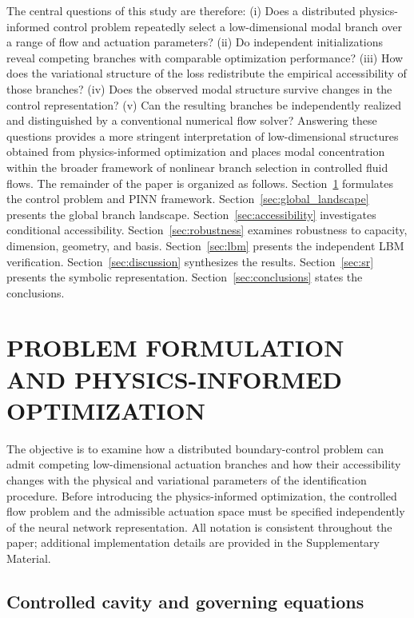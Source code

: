 \documentclass[a4paper,11pt]{article}
\begin{document}
The central questions of this study are therefore: (i) Does a distributed
physics-informed control problem repeatedly select a low-dimensional modal branch
over a range of flow and actuation parameters? (ii) Do independent initializations
reveal competing branches with comparable optimization performance? (iii) How does
the variational structure of the loss redistribute the empirical accessibility of
those branches? (iv) Does the observed modal structure survive changes in the
control representation? (v) Can the resulting branches be independently realized
and distinguished by a conventional numerical flow solver? Answering these questions
provides a more stringent interpretation of low-dimensional structures obtained from
physics-informed optimization and places modal concentration within the broader
framework of nonlinear branch selection in controlled fluid flows. The remainder of
the paper is organized as follows. Section~\ref{sec:problem_and_pinn} formulates the
control problem and PINN framework. Section~\ref{sec:global_landscape} presents the
global branch landscape. Section~\ref{sec:accessibility} investigates conditional
accessibility. Section~\ref{sec:robustness} examines robustness to capacity,
dimension, geometry, and basis. Section~\ref{sec:lbm} presents the independent LBM
verification. Section~\ref{sec:discussion} synthesizes the results.
Section~\ref{sec:sr} presents the symbolic representation.
Section~\ref{sec:conclusions} states the conclusions.

\section{PROBLEM FORMULATION AND PHYSICS-INFORMED OPTIMIZATION}
\label{sec:problem_and_pinn}

The objective is to examine how a distributed boundary-control problem can admit
competing low-dimensional actuation branches and how their accessibility changes
with the physical and variational parameters of the identification procedure.
Before introducing the physics-informed optimization, the controlled flow problem
and the admissible actuation space must be specified independently of the neural
network representation. All notation is consistent throughout the paper; additional
implementation details are provided in the Supplementary Material.

\subsection{Controlled cavity and governing equations}
\end{document}
